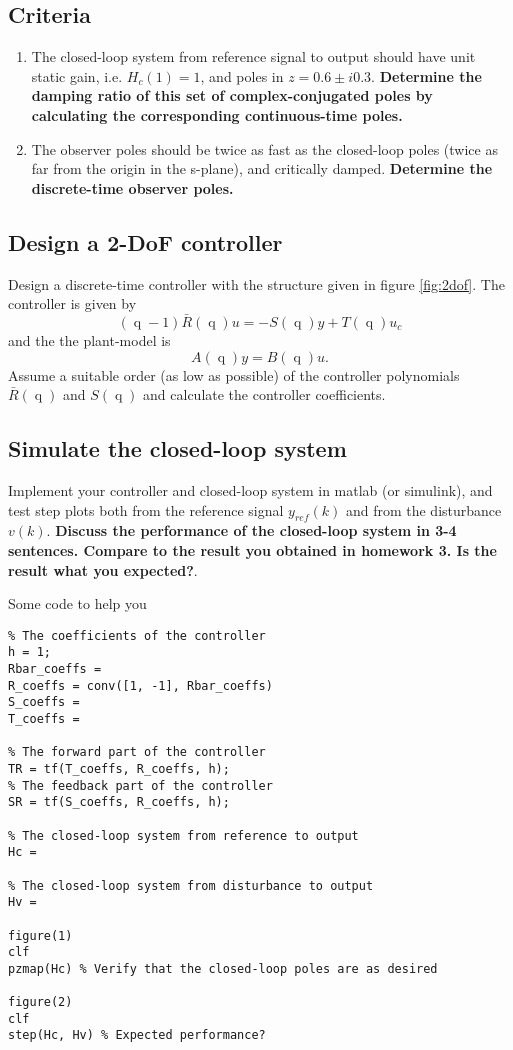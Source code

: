 \documentclass[a4paper]{scrartcl}
\DeclareMathOperator{\shift}{q}
\begin{document}
\subsection*{Criteria}
\label{sec-1-1}
\begin{enumerate}
\item The closed-loop system from reference signal to output should have unit static gain, i.e. \(H_c(1) = 1\), and poles in \(z = 0.6 \pm i0.3\). \textbf{Determine the damping ratio of this set of complex-conjugated poles by calculating the corresponding continuous-time poles.}
\item The observer poles should be twice as fast as the closed-loop poles (twice as far from the origin in the s-plane), and critically damped. \textbf{Determine the discrete-time observer poles.}
\end{enumerate}

\subsection*{Design a 2-DoF controller}
\label{sec-1-2}
Design a discrete-time controller with the structure given in figure \ref{fig:2dof}. The controller is given by 
\[ (\shift-1)\bar{R}(\shift)u = -S(\shift)y + T(\shift)u_c \]
and the the plant-model is
\[ A(\shift)y = B(\shift)u.\]
Assume a suitable order (as low as possible) of the controller polynomials $\bar{R}(\shift)$ and $S(\shift)$ and calculate the controller coefficients. 

\subsection*{Simulate the closed-loop system}
\label{sec-1-3}
Implement your controller and closed-loop system in matlab (or simulink), and test step plots both from the reference signal $y_{ref}(k)$ and from the disturbance $v(k)$. 
\textbf{Discuss the performance of the closed-loop system in 3-4 sentences. Compare to the result you obtained in homework 3. Is the result what you expected?}.

Some code to help you
\begin{verbatim}
% The coefficients of the controller
h = 1;
Rbar_coeffs = 
R_coeffs = conv([1, -1], Rbar_coeffs)
S_coeffs = 
T_coeffs = 

% The forward part of the controller
TR = tf(T_coeffs, R_coeffs, h);
% The feedback part of the controller
SR = tf(S_coeffs, R_coeffs, h);

% The closed-loop system from reference to output
Hc = 

% The closed-loop system from disturbance to output
Hv =  

figure(1)
clf
pzmap(Hc) % Verify that the closed-loop poles are as desired

figure(2)
clf
step(Hc, Hv) % Expected performance?
\end{verbatim}
\end{document}
